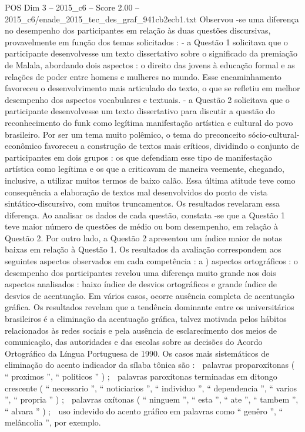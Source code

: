 \begin{textsample}{POS Dim 3 – 2015\_c6 – Score 2.00 – 2015\_c6/enade\_2015\_tec\_des\_graf\_941cb2ecb1.txt}
Observou -se uma diferença no desempenho dos participantes em relação às duas questões discursivas, provavelmente em função dos temas solicitados : - a Questão 1 solicitava que o participante desenvolvesse um texto dissertativo sobre o significado da premiação de Malala, abordando dois aspectos : o direito das jovens à educação formal e as relações de poder entre homens e mulheres no mundo.
Esse encaminhamento favoreceu o desenvolvimento mais articulado do texto, o que se refletiu em melhor desempenho dos aspectos vocabulares e textuais. - a Questão 2 solicitava que o participante desenvolvesse um texto dissertativo para discutir a questão do reconhecimento do funk como legítima manifestação artística e cultural do povo brasileiro.
Por ser um tema muito polêmico, o tema do preconceito sócio-cultural-econômico favoreceu a construção de textos mais críticos, dividindo o conjunto de participantes em dois grupos : os que defendiam esse tipo de manifestação artística como legítima e os que a criticavam de maneira veemente, chegando, inclusive, a utilizar muitos termos de baixo calão.
Essa última atitude teve como consequência a elaboração de textos mal desenvolvidos do ponto de vista sintático-discursivo, com muitos truncamentos.
Os resultados revelaram essa diferença.
Ao analisar os dados de cada questão, constata -se que a Questão 1 teve maior número de questões de médio ou bom desempenho, em relação à Questão 2.
Por outro lado, a Questão 2 apresentou um índice maior de notas baixas em relação à Questão 1.
Os resultados da avaliação correspondem aos seguintes aspectos observados em cada competência : a ) aspectos ortográficos : o desempenho dos participantes revelou uma diferença muito grande nos dois aspectos analisados : baixo índice de desvios ortográficos e grande índice de desvios de acentuação.
Em vários casos, ocorre ausência completa de acentuação gráfica.
Os resultados revelam que a tendência dominante entre os universitários brasileiros é a eliminação da acentuação gráfica, talvez motivada pelos hábitos relacionados às redes sociais e pela ausência de esclarecimento dos meios de comunicação, das autoridades e das escolas sobre as decisões do Acordo Ortográfico da Língua Portuguesa de 1990.
Os casos mais sistemáticos de eliminação do acento indicador da sílaba tônica são :  palavras proparoxítonas ( “ proximos ”, “ politicos ” ) ;  palavras paroxítonas terminadas em ditongo crescente ( “ necessario ”, “ noticiarios ”, “ individuo ”, “ dependencia ”, “ varios ”, “ propria ” ) ;  palavras oxítonas ( “ ninguem ”, “ esta ”, “ ate ”, “ tambem ”, “ alvara ” ) ;  uso indevido do acento gráfico em palavras como “ genêro ”, “ melâncolia ”, por exemplo.

\end{textsample}
